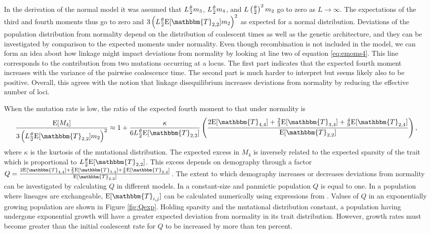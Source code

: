 
In the derivation of the normal model it was assumed that $L\frac{\theta}{2} m_3$, $L \frac{\theta}{2} m_4$,
and $L \left( \frac{\theta}{2} \right)^2 m_2$ go to zero as $L\to \infty$. The expectations of
the third and fourth moments thus go to zero and $3\left(L \T
\E[\mathbbm{T}_{2,2}] m_2\right)^2$ as expected for a normal distribution.
Deviations of the population distribution from normality depend on the
distribution of coalescent times as well as the genetic architecture, and they
can be investigated by comparison to the expected moments under normality. Even
though recombination is not included in the model, we can form an idea about how
linkage might impact deviations from normality by looking at line two of
equation \eqref{eq:emoms4}. This line corresponds to the contribution from two
mutations occurring at a locus. The first part indicates that the expected
fourth moment increases with the variance of the pairwise coalescence time. The
second part is much harder to interpret but seems likely also to be positive.
Overall, this agrees with the notion that linkage disequilibrium increases
deviations from normality by reducing the effective number of loci.

When the mutation rate is low, the ratio of the expected fourth moment to that
under normality is
\begin{equation}
  \label{eq:popmom4coal}
  \frac{\E[M_4]}{3\left(L \T \E[\mathbbm{T}_{2,2}] m_2\right)^2} \approx 1 +
  \frac{\kappa}{6 L \T \E[\mathbbm{T}_{2,2}]}\left( \frac{2\E[\mathbbm{T}_{4,4}] +
      \frac{2}{3}\E[\mathbbm{T}_{3,4}] +
      \frac{4}{9}\E[\mathbbm{T}_{2,4}]}{\E[\mathbbm{T}_{2,2}]}\right),
\end{equation}
where $\kappa$ is the kurtosis of the mutational distribution. The expected
excess in $M_4$ is inversely related to the expected sparsity of the trait which
is proportional to $L \T \E[\mathbbm{T}_{2,2}]$. This excess depends on
demography through a factor $Q = \frac{2\E[\mathbbm{T}_{4,4}] +
  \frac{2}{3}\E[\mathbbm{T}_{3,4}] +
  \frac{4}{9}\E[\mathbbm{T}_{2,4}]}{\E[\mathbbm{T}_{2,2}]}$. The extent to which
demography increases or decreases deviations from normality can be investigated
by calculating $Q$ in different models. In a constant-size and panmictic
population $Q$ is equal to one. In a population where lineages are exchangeable,
$\E[\mathbbm{T}_{i,j}]$ can be calculated numerically using expressions from
\citet{Griffiths1998}. Values of $Q$ in an exponentially growing population are
shown in Figure \ref{fig:Qexp}. Holding sparsity and the mutational distribution
constant, a population having undergone exponential growth will have a greater
expected deviation from normality in its trait distribution. However, growth
rates must become greater than the initial coalescent rate for $Q$ to be
increased by more than ten percent.

